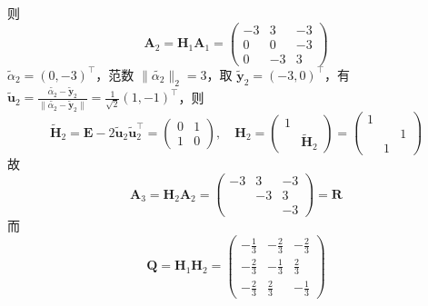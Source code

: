 \documentclass{sjtuarticle}
\begin{document}
\begin{itemize}
\begin{solution}
        则
        \begin{equation*}
            \mathbf{A}_2 = \mathbf{H}_1\mathbf{A}_1= \begin{pmatrix}
                -3 & 3 & -3 \\ 0 & 0 & -3 \\ 0 & -3 & 3
            \end{pmatrix}
        \end{equation*}
        $\tilde{\alpha}_2=(0,-3)^\top$，范数 $\lVert \tilde{\alpha_2}\rVert_2=3$，取 $\tilde{\mathbf{y}}_2=(-3,0)^\top$，有 $\tilde{\mathbf{u}}_2=\frac{\tilde{\alpha_2}-\tilde{\mathbf{y}}_2}{\lVert \tilde{\alpha_2}-\tilde{\mathbf{y}}_2 \rVert}=\frac{1}{\sqrt{2}}(1,-1)^\top$，则
        \begin{equation*}
            \tilde{\mathbf{H}}_2=\mathbf{E}-2\tilde{\mathbf{u}}_2\tilde{\mathbf{u}}_2^\top=\begin{pmatrix}
                0 & 1 \\ 1 & 0
            \end{pmatrix},\quad \mathbf{H}_2=\begin{pmatrix}
                1 \\ & \tilde{\mathbf{H}}_2
            \end{pmatrix}=\begin{pmatrix}
                1\\ & & 1\\ & 1
            \end{pmatrix}
        \end{equation*}
        故 
        \begin{equation*}
            \mathbf{A}_3=\mathbf{H}_2\mathbf{A}_2=\begin{pmatrix}
                -3 & 3 & -3 \\ & -3 & 3 \\ & & -3
            \end{pmatrix}=\mathbf{R}
        \end{equation*}
        而
        \begin{equation*}
            \mathbf{Q}=\mathbf{H}_1\mathbf{H}_2=\begin{pmatrix}
                -\frac13 &  -\frac23 & -\frac23  \\ -\frac23 &  -\frac13 & \frac23  \\ -\frac23 & \frac23 & -\frac13 
            \end{pmatrix}
        \end{equation*}
    \end{solution}
\end{itemize}
\end{document}
